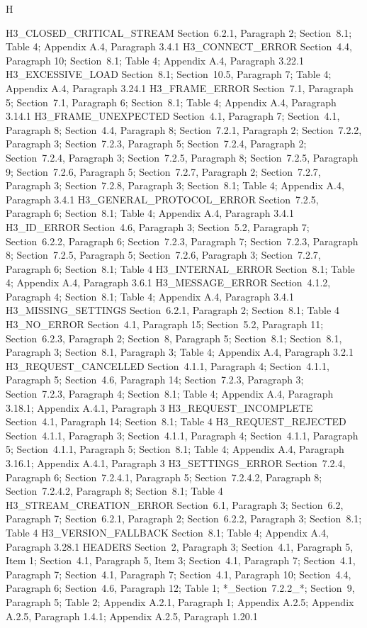 \documentclass{article}
\begin{document}
H

H3\_CLOSED\_CRITICAL\_STREAM  Section~6.2.1, Paragraph 2; Section~8.1; Table 4; Appendix A.4, Paragraph 3.4.1 H3\_CONNECT\_ERROR  Section~4.4, Paragraph 10; Section~8.1; Table 4; Appendix A.4, Paragraph 3.22.1 H3\_EXCESSIVE\_LOAD  Section~8.1; Section~10.5, Paragraph 7; Table 4; Appendix A.4, Paragraph 3.24.1 H3\_FRAME\_ERROR  Section~7.1, Paragraph 5; Section~7.1, Paragraph 6; Section~8.1; Table 4; Appendix A.4, Paragraph 3.14.1 H3\_FRAME\_UNEXPECTED  Section~4.1, Paragraph 7; Section~4.1, Paragraph 8; Section~4.4, Paragraph 8; Section~7.2.1, Paragraph 2; Section~7.2.2, Paragraph 3; Section~7.2.3, Paragraph 5; Section~7.2.4, Paragraph 2; Section~7.2.4, Paragraph 3; Section~7.2.5, Paragraph 8; Section~7.2.5, Paragraph 9; Section~7.2.6, Paragraph 5; Section~7.2.7, Paragraph 2; Section~7.2.7, Paragraph 3; Section~7.2.8, Paragraph 3; Section~8.1; Table 4; Appendix A.4, Paragraph 3.4.1 H3\_GENERAL\_PROTOCOL\_ERROR  Section~7.2.5, Paragraph 6; Section~8.1; Table 4; Appendix A.4, Paragraph 3.4.1 H3\_ID\_ERROR  Section~4.6, Paragraph 3; Section~5.2, Paragraph 7; Section~6.2.2, Paragraph 6; Section~7.2.3, Paragraph 7; Section~7.2.3, Paragraph 8; Section~7.2.5, Paragraph 5; Section~7.2.6, Paragraph 3; Section~7.2.7, Paragraph 6; Section~8.1; Table 4 H3\_INTERNAL\_ERROR  Section~8.1; Table 4; Appendix A.4, Paragraph 3.6.1 H3\_MESSAGE\_ERROR  Section~4.1.2, Paragraph 4; Section~8.1; Table 4; Appendix A.4, Paragraph 3.4.1 H3\_MISSING\_SETTINGS  Section~6.2.1, Paragraph 2; Section~8.1; Table 4 H3\_NO\_ERROR  Section~4.1, Paragraph 15; Section~5.2, Paragraph 11; Section~6.2.3, Paragraph 2; Section~8, Paragraph 5; Section~8.1; Section~8.1, Paragraph 3; Section~8.1, Paragraph 3; Table 4; Appendix A.4, Paragraph 3.2.1 H3\_REQUEST\_CANCELLED  Section~4.1.1, Paragraph 4; Section~4.1.1, Paragraph 5; Section~4.6, Paragraph 14; Section~7.2.3, Paragraph 3; Section~7.2.3, Paragraph 4; Section~8.1; Table 4; Appendix A.4, Paragraph 3.18.1; Appendix A.4.1, Paragraph 3 H3\_REQUEST\_INCOMPLETE  Section~4.1, Paragraph 14; Section~8.1; Table 4 H3\_REQUEST\_REJECTED  Section~4.1.1, Paragraph 3; Section~4.1.1, Paragraph 4; Section~4.1.1, Paragraph 5; Section~4.1.1, Paragraph 5; Section~8.1; Table 4; Appendix A.4, Paragraph 3.16.1; Appendix A.4.1, Paragraph 3 H3\_SETTINGS\_ERROR  Section~7.2.4, Paragraph 6; Section~7.2.4.1, Paragraph 5; Section~7.2.4.2, Paragraph 8; Section~7.2.4.2, Paragraph 8; Section~8.1; Table 4 H3\_STREAM\_CREATION\_ERROR  Section~6.1, Paragraph 3; Section~6.2, Paragraph 7; Section~6.2.1, Paragraph 2; Section~6.2.2, Paragraph 3; Section~8.1; Table 4 H3\_VERSION\_FALLBACK  Section~8.1; Table 4; Appendix A.4, Paragraph 3.28.1 HEADERS  Section~2, Paragraph 3; Section~4.1, Paragraph 5, Item 1; Section~4.1, Paragraph 5, Item 3; Section~4.1, Paragraph 7; Section~4.1, Paragraph 7; Section~4.1, Paragraph 7; Section~4.1, Paragraph 10; Section~4.4, Paragraph 6; Section~4.6, Paragraph 12; Table 1; *\_Section~7.2.2\_*; Section~9, Paragraph 5; Table 2; Appendix A.2.1, Paragraph 1; Appendix A.2.5; Appendix A.2.5, Paragraph 1.4.1; Appendix A.2.5, Paragraph 1.20.1
\end{document}
